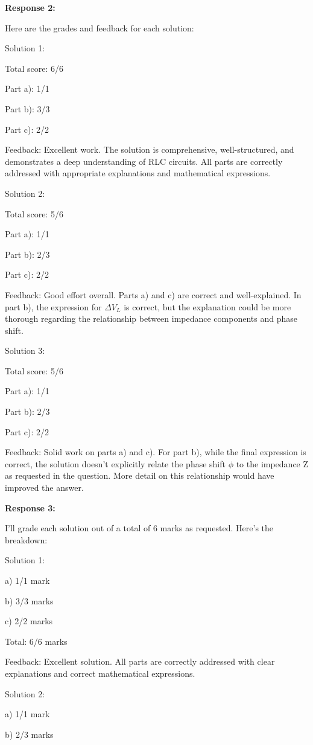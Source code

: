 \documentclass[a4paper,11pt]{article}
\begin{document}
\bigskip
\textbf{Response 2:}

Here are the grades and feedback for each solution:

Solution 1:

Total score: 6/6

Part a): 1/1

Part b): 3/3

Part c): 2/2

Feedback: Excellent work. The solution is comprehensive, well-structured, and demonstrates a deep understanding of RLC circuits. All parts are correctly addressed with appropriate explanations and mathematical expressions.

Solution 2:

Total score: 5/6

Part a): 1/1

Part b): 2/3

Part c): 2/2

Feedback: Good effort overall. Parts a) and c) are correct and well-explained. In part b), the expression for \(\Delta V_L \) is correct, but the explanation could be more thorough regarding the relationship between impedance components and phase shift.

Solution 3:

Total score: 5/6

Part a): 1/1

Part b): 2/3

Part c): 2/2

Feedback: Solid work on parts a) and c). For part b), while the final expression is correct, the solution doesn't explicitly relate the phase shift \(\phi\) to the impedance Z as requested in the question. More detail on this relationship would have improved the answer.

\bigskip
\textbf{Response 3:}

I'll grade each solution out of a total of 6 marks as requested. Here's the breakdown:

Solution 1:

a) 1/1 mark

b) 3/3 marks

c) 2/2 marks

Total: 6/6 marks

Feedback: Excellent solution. All parts are correctly addressed with clear explanations and correct mathematical expressions.

Solution 2:

a) 1/1 mark

b) 2/3 marks
\end{document}
